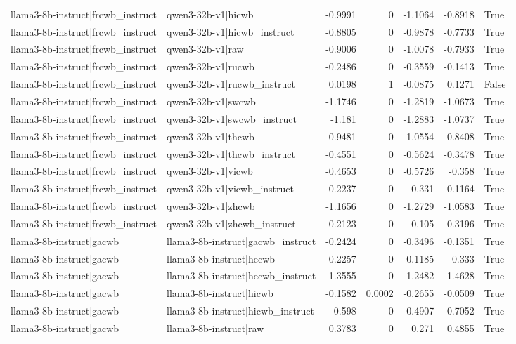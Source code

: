 \begin{table}
\begin{tabular}{l l r r r r l}
llama3-8b-instruct|frcwb_instruct & qwen3-32b-v1|hicwb & -0.9991 & 0 & -1.1064 & -0.8918 & True \\
llama3-8b-instruct|frcwb_instruct & qwen3-32b-v1|hicwb_instruct & -0.8805 & 0 & -0.9878 & -0.7733 & True \\
llama3-8b-instruct|frcwb_instruct & qwen3-32b-v1|raw & -0.9006 & 0 & -1.0078 & -0.7933 & True \\
llama3-8b-instruct|frcwb_instruct & qwen3-32b-v1|rucwb & -0.2486 & 0 & -0.3559 & -0.1413 & True \\
llama3-8b-instruct|frcwb_instruct & qwen3-32b-v1|rucwb_instruct & 0.0198 & 1 & -0.0875 & 0.1271 & False \\
llama3-8b-instruct|frcwb_instruct & qwen3-32b-v1|swcwb & -1.1746 & 0 & -1.2819 & -1.0673 & True \\
llama3-8b-instruct|frcwb_instruct & qwen3-32b-v1|swcwb_instruct & -1.181 & 0 & -1.2883 & -1.0737 & True \\
llama3-8b-instruct|frcwb_instruct & qwen3-32b-v1|thcwb & -0.9481 & 0 & -1.0554 & -0.8408 & True \\
llama3-8b-instruct|frcwb_instruct & qwen3-32b-v1|thcwb_instruct & -0.4551 & 0 & -0.5624 & -0.3478 & True \\
llama3-8b-instruct|frcwb_instruct & qwen3-32b-v1|vicwb & -0.4653 & 0 & -0.5726 & -0.358 & True \\
llama3-8b-instruct|frcwb_instruct & qwen3-32b-v1|vicwb_instruct & -0.2237 & 0 & -0.331 & -0.1164 & True \\
llama3-8b-instruct|frcwb_instruct & qwen3-32b-v1|zhcwb & -1.1656 & 0 & -1.2729 & -1.0583 & True \\
llama3-8b-instruct|frcwb_instruct & qwen3-32b-v1|zhcwb_instruct & 0.2123 & 0 & 0.105 & 0.3196 & True \\
llama3-8b-instruct|gacwb & llama3-8b-instruct|gacwb_instruct & -0.2424 & 0 & -0.3496 & -0.1351 & True \\
llama3-8b-instruct|gacwb & llama3-8b-instruct|hecwb & 0.2257 & 0 & 0.1185 & 0.333 & True \\
llama3-8b-instruct|gacwb & llama3-8b-instruct|hecwb_instruct & 1.3555 & 0 & 1.2482 & 1.4628 & True \\
llama3-8b-instruct|gacwb & llama3-8b-instruct|hicwb & -0.1582 & 0.0002 & -0.2655 & -0.0509 & True \\
llama3-8b-instruct|gacwb & llama3-8b-instruct|hicwb_instruct & 0.598 & 0 & 0.4907 & 0.7052 & True \\
llama3-8b-instruct|gacwb & llama3-8b-instruct|raw & 0.3783 & 0 & 0.271 & 0.4855 & True \\

\end{tabular}
\end{table}
